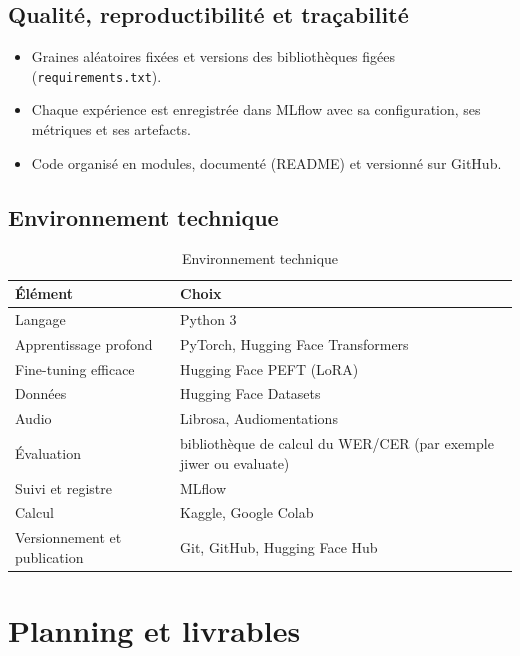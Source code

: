\documentclass[12pt,a4paper]{report}
\begin{document}
\section{Qualité, reproductibilité et traçabilité}
\begin{itemize}
  \item Graines aléatoires fixées et versions des bibliothèques figées
        (\texttt{requirements.txt}).
  \item Chaque expérience est enregistrée dans MLflow avec sa configuration, ses
        métriques et ses artefacts.
  \item Code organisé en modules, documenté (README) et versionné sur GitHub.
\end{itemize}

\section{Environnement technique}
\begin{table}[h]
  \centering
  \small
  \begin{tabularx}{\textwidth}{lX}
    \toprule
    \textbf{Élément} & \textbf{Choix} \\
    \midrule
    Langage & Python 3 \\
    Apprentissage profond & PyTorch, Hugging Face Transformers \\
    Fine-tuning efficace & Hugging Face PEFT (LoRA) \\
    Données & Hugging Face Datasets \\
    Audio & Librosa, Audiomentations \\
    Évaluation & bibliothèque de calcul du WER/CER (par exemple jiwer ou evaluate) \\
    Suivi et registre & MLflow \\
    Calcul & Kaggle, Google Colab \\
    Versionnement et publication & Git, GitHub, Hugging Face Hub \\
    \bottomrule
  \end{tabularx}
  \caption{Environnement technique}
  \label{tab:environnement}
\end{table}

\chapter{Planning et livrables}
\end{document}
